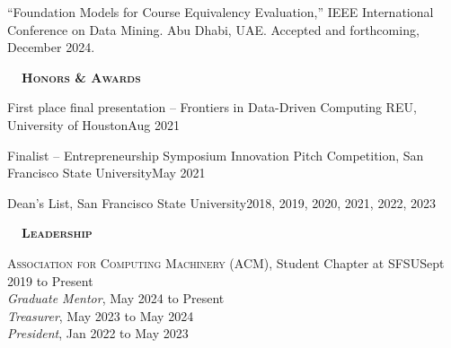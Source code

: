 \documentclass[hidelinks, 10pt]{article}
\def\contentwidth{0.9\linewidth}    %
\def\contentspacing{2.5mm}          %
\def\sectionspacing{6mm}            %
\def\sectiontocontentspacing{4mm}   %
\renewcommand{\section}[1]{
    {\fontsize{14}{14}\selectfont \textsc{\textbf{\ \ #1\ \ }}}\hrulefill
}
\begin{document}
{\vspace{\contentspacing}

\begin{minipage}[ct]{\contentwidth}
    ``Foundation Models for Course Equivalency Evaluation,'' IEEE International Conference on Data Mining.  Abu Dhabi, UAE.  Accepted and
    forthcoming, December 2024.
\end{minipage}

\vspace{\sectionspacing}


\section{Honors \& Awards}

\vspace{\sectiontocontentspacing}

\begin{minipage}[ct]{0.9\linewidth}
    First place final presentation -- Frontiers in Data-Driven Computing REU,
    University of Houston\hfill Aug 2021

    \vspace{1.5mm}

    Finalist -- Entrepreneurship Symposium Innovation Pitch Competition, San
    Francisco State University\hfill May 2021

    \vspace{1.5mm}

    Dean's List, San Francisco State University\hfill 2018, 2019, 2020, 2021, 2022, 2023
\end{minipage}

\vspace{\sectionspacing}


\section{Leadership}

\vspace{\sectiontocontentspacing}

\begin{minipage}[ct]{0.9\linewidth}
    \textsc{Association for Computing Machinery} (ACM), Student Chapter at SFSU\hfill Sept 2019 to Present\\
    \emph{Graduate Mentor}, May 2024 to Present\\
    \emph{Treasurer}, May 2023 to May 2024\\
    \emph{President}, Jan 2022 to May 2023
\end{minipage}

}
\end{document}

